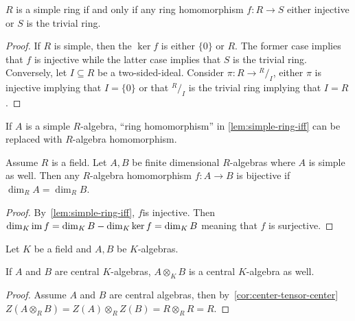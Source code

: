 \begin{lemma}\label{lem:simple-ring-iff}
  $R$ is a simple ring if and only if any ring homomorphism $f : R \to S$ either
  injective or $S$ is the trivial ring. \leanok
\end{lemma}
\begin{proof}
  If $R$ is simple, then the $\ker f$ is either $\{0\}$ or $R$. The former case
  implies that $f$ is injective while the latter case implies that $S$ is the
  trivial ring. Conversely, let $I\subseteq R$ be a two-sided-ideal. Consider
  $\pi: R \to {}^{R}/_{I}$, either $\pi$ is injective implying that $I = \{0\}$
  or that ${}^{R}/_{I}$ is the trivial ring implying that $I = R$.
\end{proof}
\begin{remark}
  If $A$ is a simple $R$-algebra, ``ring homomorphism'' in \cref{lem:simple-ring-iff} can be replaced with $R$-algebra homomorphism.
\end{remark}

\begin{corollary}\label{cor:alghom-bijective-of-dim-eq}
  Assume $R$ is a field. Let $A, B$ be finite dimensional $R$-algebras where $A$
  is simple as well. Then any $R$-algebra homomorphism $f:A\to B$ is bijective
  if $\dim_{R}A=\dim_{R}B$. 
  \leanok
\end{corollary}
\begin{proof}
  By~\cref{lem:simple-ring-iff}, $f$is injective. Then
  $\dim_{K}\operatorname{im} f = \dim_{K} B - \dim_{K}\ker f = \dim_{K}B$ meaning that $f$ is
  surjective.
\end{proof}

Let $K$ be a field and $A, B$ be $K$-algebras.
\begin{lemma}
  \label{lem:tensor-central}
  If $A$ and $B$ are central $K$-algebras, $A\otimes_{K}B$ is a central
  $K$-algebra as well.
  \leanok
\end{lemma}
\begin{proof}
  Assume $A$ and $B$ are central algebras, then
  by~\cref{cor:center-tensor-center}
  $Z\left(A\otimes_{R}B\right)=Z\left(A\right)\otimes_{R}Z\left(B\right)=R\otimes_{R}R=R$.
\end{proof}

